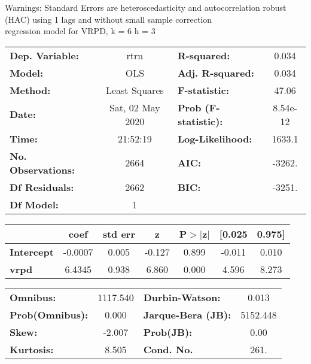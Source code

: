 Warnings: \newline
 [1] Standard Errors are heteroscedasticity and autocorrelation robust (HAC) using 1 lags and without small sample correction\\ 

regression model for VRPD, k = 6 h = 3\begin{center}
\begin{tabular}{lclc}
\toprule
\textbf{Dep. Variable:}    &       rtrn       & \textbf{  R-squared:         } &     0.034   \\
\textbf{Model:}            &       OLS        & \textbf{  Adj. R-squared:    } &     0.034   \\
\textbf{Method:}           &  Least Squares   & \textbf{  F-statistic:       } &     47.06   \\
\textbf{Date:}             & Sat, 02 May 2020 & \textbf{  Prob (F-statistic):} &  8.54e-12   \\
\textbf{Time:}             &     21:52:19     & \textbf{  Log-Likelihood:    } &    1633.1   \\
\textbf{No. Observations:} &        2664      & \textbf{  AIC:               } &    -3262.   \\
\textbf{Df Residuals:}     &        2662      & \textbf{  BIC:               } &    -3251.   \\
\textbf{Df Model:}         &           1      & \textbf{                     } &             \\
\bottomrule
\end{tabular}
\begin{tabular}{lcccccc}
                   & \textbf{coef} & \textbf{std err} & \textbf{z} & \textbf{P$> |$z$|$} & \textbf{[0.025} & \textbf{0.975]}  \\
\midrule
\textbf{Intercept} &      -0.0007  &        0.005     &    -0.127  &         0.899        &       -0.011    &        0.010     \\
\textbf{vrpd}      &       6.4345  &        0.938     &     6.860  &         0.000        &        4.596    &        8.273     \\
\bottomrule
\end{tabular}
\begin{tabular}{lclc}
\textbf{Omnibus:}       & 1117.540 & \textbf{  Durbin-Watson:     } &    0.013  \\
\textbf{Prob(Omnibus):} &   0.000  & \textbf{  Jarque-Bera (JB):  } & 5152.448  \\
\textbf{Skew:}          &  -2.007  & \textbf{  Prob(JB):          } &     0.00  \\
\textbf{Kurtosis:}      &   8.505  & \textbf{  Cond. No.          } &     261.  \\
\bottomrule
\end{tabular}
\end{center}

